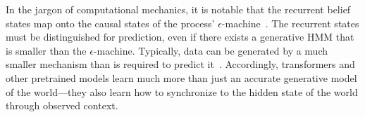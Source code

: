 \documentclass{article}
\begin{document}




In the jargon of computational mechanics, it is notable that the recurrent belief states map onto the causal states 
of the process' $\epsilon$-machine~\citep{Crut12a}.  The recurrent states must be distinguished for prediction, even if there exists a generative HMM that is smaller than the $\epsilon$-machine.
Typically, data can be generated by a much smaller mechanism than is required to predict it~\cite{lohr2012predictive, ruebeck2018prediction}. 
Accordingly, transformers and other pretrained models learn much more than just an accurate generative model of the world---they also learn how to synchronize to the hidden state of the world through observed context.

\end{document}
